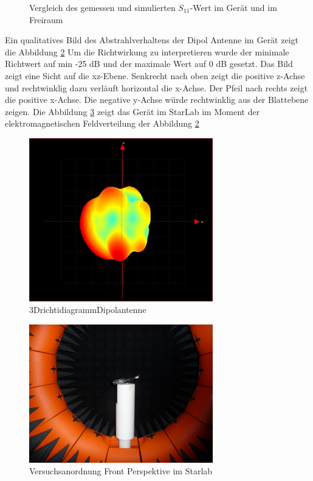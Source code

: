 \begin{figure}[!ht]
	\centering
	\begingroup
	
	\endgroup
	\caption{Vergleich des gemessen und simulierten $S_{11}$-Wert im Ger\"at und im Freiraum}	\label{S11_Messung_Simulation_Dipolantenn_Freiraum}
\end{figure}
\newpage
Ein qualitatives Bild des Abstrahlverhaltens der Dipol Antenne im Gerät zeigt die Abbildung \ref{fig:3D Richtdiagramm} Um die Richtwirkung zu interpretieren wurde der minimale Richtwert auf min -25 dB und der maximale Wert auf 0 dB gesetzt. Das Bild zeigt eine Sicht auf die xz-Ebene. Senkrecht nach oben zeigt die positive z-Achse und rechtwinklig dazu verläuft horizontal die x-Achse. Der Pfeil nach rechts zeigt die positive x-Achse. Die negative y-Achse würde rechtwinklig aus der Blattebene zeigen. Die Abbildung \ref{fig:FrontStarLab} zeigt das Gerät im StarLab im Moment der elektromagnetischen Feldverteilung der Abbildung \ref{fig:3D Richtdiagramm}\\
\begin{figure}[!h]
	\centering
	\includegraphics[width=8cm]{content/bilder/Implementierung/min25_0_x_yhinten_zoben.JPG}%
	\caption{3DrichtidiagrammDipolantenne}
	\label{fig:3D Richtdiagramm}
\end{figure}
\begin{figure}[!h]
	\centering
	\includegraphics[width=8cm]{content/bilder/Implementierung/Front.JPG}%
	\caption{Versuchsanordnung Front Perspektive im Starlab}
	\label{fig:FrontStarLab}
\end{figure}
